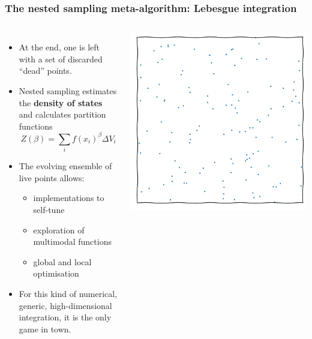 \documentclass[aspectratio=169]{beamer}
\begin{document}
\begin{frame}
    \frametitle{The nested sampling meta-algorithm: Lebesgue integration}
    \begin{columns}
        \begin{itemize}
            \item At the end, one is left with a set of discarded ``dead'' points.
            \item Nested sampling estimates the \textbf{density of states} and calculates partition functions
                \[Z(\beta) = \sum_i f(x_i)^\beta \Delta V_i\]
            \item The evolving ensemble of live points allows:
                \begin{itemize}
                    \item implementations to self-tune
                    \item exploration of multimodal functions
                    \item global and local optimisation
                \end{itemize}
            \item For this kind of numerical, generic, high-dimensional integration, it is the only game in town.
        \end{itemize}
        \includegraphics[width=\textwidth,page=14]{figures/himmelblau}%

\end{columns}
\end{frame}
\end{document}
